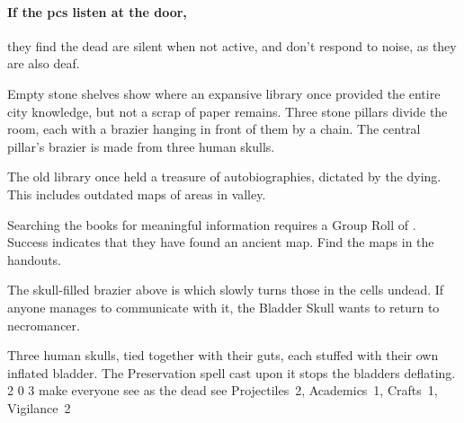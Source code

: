 \paragraph{If the \glspl{pc} listen at the door,}
they find the dead are silent when not active, and don't respond to noise, as they are also deaf.%


\begin{boxtext}

  Empty stone shelves show where an expansive library once provided the entire city knowledge, but not a scrap of paper remains.
  Three stone pillars divide the room, each with a brazier hanging in front of them by a chain.
  The central pillar's brazier is made from three human skulls.

\end{boxtext}


\begin{exampletext}
  The old library once held a treasure of autobiographies, dictated by the dying.
  This includes outdated maps of areas in \gls{valley}.
\end{exampletext}

\noindent
Searching the books for meaningful information requires a Group Roll of .
Success indicates that they have found an ancient map.
Find the maps in the handouts.

The skull-filled brazier above is  which slowly turns those in the cells undead.
If anyone manages to communicate with it, the Bladder Skull wants to return to \gls{necromancer}.

  {Three human skulls, tied together with their guts, each stuffed with their own inflated bladder.
  The Preservation spell cast upon it stops the bladders deflating.}%
  {2}%
  {0}%
  {3}%
  {make everyone see as the dead see}%
  {
    \setcounter{Fate}{2}
    \setcounter{Air}{2}
    \setcounter{Water}{1}
  }%
  {Projectiles~2, Academics~1, Crafts~1, Vigilance~2}%
  {
    \revelationSpell
  }%

